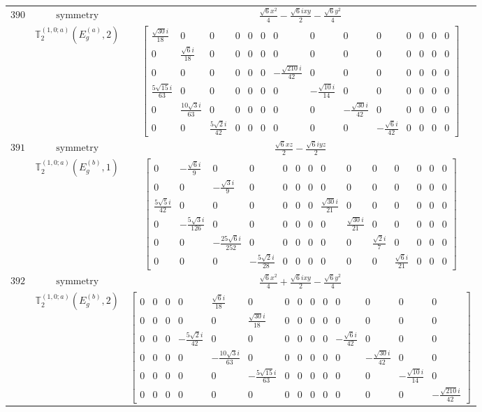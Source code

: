 \documentclass[fleqn,8pt,landscape]{jsarticle}
\begin{document}
\begin{longtable}{ccc}
$ 390 $ & $ \text{symmetry} $ & $ \frac{\sqrt{6} x^{2}}{4} - \frac{\sqrt{6} i x y}{2} - \frac{\sqrt{6} y^{2}}{4} $ \\
$  $ & $ \mathbb{T}_{2}^{(1,0;a)}(E_{g}^{(a)},2) $ & $ \begin{bmatrix} \frac{\sqrt{30} i}{18} & 0 & 0 & 0 & 0 & 0 & 0 & 0 & 0 & 0 & 0 & 0 & 0 & 0 \\ 0 & \frac{\sqrt{6} i}{18} & 0 & 0 & 0 & 0 & 0 & 0 & 0 & 0 & 0 & 0 & 0 & 0 \\ 0 & 0 & 0 & 0 & 0 & 0 & - \frac{\sqrt{210} i}{42} & 0 & 0 & 0 & 0 & 0 & 0 & 0 \\ \frac{5 \sqrt{15} i}{63} & 0 & 0 & 0 & 0 & 0 & 0 & - \frac{\sqrt{10} i}{14} & 0 & 0 & 0 & 0 & 0 & 0 \\ 0 & \frac{10 \sqrt{3} i}{63} & 0 & 0 & 0 & 0 & 0 & 0 & - \frac{\sqrt{30} i}{42} & 0 & 0 & 0 & 0 & 0 \\ 0 & 0 & \frac{5 \sqrt{2} i}{42} & 0 & 0 & 0 & 0 & 0 & 0 & - \frac{\sqrt{6} i}{42} & 0 & 0 & 0 & 0 \end{bmatrix} $ \\ \hline
$ 391 $ & $ \text{symmetry} $ & $ \frac{\sqrt{6} x z}{2} - \frac{\sqrt{6} i y z}{2} $ \\
$  $ & $ \mathbb{T}_{2}^{(1,0;a)}(E_{g}^{(b)},1) $ & $ \begin{bmatrix} 0 & - \frac{\sqrt{6} i}{9} & 0 & 0 & 0 & 0 & 0 & 0 & 0 & 0 & 0 & 0 & 0 & 0 \\ 0 & 0 & - \frac{\sqrt{3} i}{9} & 0 & 0 & 0 & 0 & 0 & 0 & 0 & 0 & 0 & 0 & 0 \\ \frac{5 \sqrt{5} i}{42} & 0 & 0 & 0 & 0 & 0 & 0 & \frac{\sqrt{30} i}{21} & 0 & 0 & 0 & 0 & 0 & 0 \\ 0 & - \frac{5 \sqrt{3} i}{126} & 0 & 0 & 0 & 0 & 0 & 0 & \frac{\sqrt{30} i}{21} & 0 & 0 & 0 & 0 & 0 \\ 0 & 0 & - \frac{25 \sqrt{6} i}{252} & 0 & 0 & 0 & 0 & 0 & 0 & \frac{\sqrt{2} i}{7} & 0 & 0 & 0 & 0 \\ 0 & 0 & 0 & - \frac{5 \sqrt{2} i}{28} & 0 & 0 & 0 & 0 & 0 & 0 & \frac{\sqrt{6} i}{21} & 0 & 0 & 0 \end{bmatrix} $ \\ \hline
$ 392 $ & $ \text{symmetry} $ & $ \frac{\sqrt{6} x^{2}}{4} + \frac{\sqrt{6} i x y}{2} - \frac{\sqrt{6} y^{2}}{4} $ \\
$  $ & $ \mathbb{T}_{2}^{(1,0;a)}(E_{g}^{(b)},2) $ & $ \begin{bmatrix} 0 & 0 & 0 & 0 & \frac{\sqrt{6} i}{18} & 0 & 0 & 0 & 0 & 0 & 0 & 0 & 0 & 0 \\ 0 & 0 & 0 & 0 & 0 & \frac{\sqrt{30} i}{18} & 0 & 0 & 0 & 0 & 0 & 0 & 0 & 0 \\ 0 & 0 & 0 & - \frac{5 \sqrt{2} i}{42} & 0 & 0 & 0 & 0 & 0 & 0 & - \frac{\sqrt{6} i}{42} & 0 & 0 & 0 \\ 0 & 0 & 0 & 0 & - \frac{10 \sqrt{3} i}{63} & 0 & 0 & 0 & 0 & 0 & 0 & - \frac{\sqrt{30} i}{42} & 0 & 0 \\ 0 & 0 & 0 & 0 & 0 & - \frac{5 \sqrt{15} i}{63} & 0 & 0 & 0 & 0 & 0 & 0 & - \frac{\sqrt{10} i}{14} & 0 \\ 0 & 0 & 0 & 0 & 0 & 0 & 0 & 0 & 0 & 0 & 0 & 0 & 0 & - \frac{\sqrt{210} i}{42} \end{bmatrix} $ \\ \hline

\end{longtable}
\end{document}
